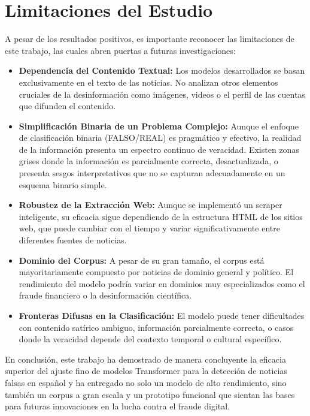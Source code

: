\section{Limitaciones del Estudio}
A pesar de los resultados positivos, es importante reconocer las limitaciones de este trabajo, las cuales abren puertas a futuras investigaciones:
\begin{itemize}
    \item \textbf{Dependencia del Contenido Textual:} Los modelos desarrollados se basan exclusivamente en el texto de las noticias. No analizan otros elementos cruciales de la desinformación como imágenes, videos o el perfil de las cuentas que difunden el contenido.
    
    \item \textbf{Simplificación Binaria de un Problema Complejo:} Aunque el enfoque de clasificación binaria (FALSO/REAL) es pragmático y efectivo, la realidad de la información presenta un espectro continuo de veracidad. Existen zonas grises donde la información es parcialmente correcta, desactualizada, o presenta sesgos interpretativos que no se capturan adecuadamente en un esquema binario simple.
    
    \item \textbf{Robustez de la Extracción Web:} Aunque se implementó un scraper inteligente, su eficacia sigue dependiendo de la estructura HTML de los sitios web, que puede cambiar con el tiempo y variar significativamente entre diferentes fuentes de noticias.
    
    \item \textbf{Dominio del Corpus:} A pesar de su gran tamaño, el corpus está mayoritariamente compuesto por noticias de dominio general y político. El rendimiento del modelo podría variar en dominios muy especializados como el fraude financiero o la desinformación científica.
    
    \item \textbf{Fronteras Difusas en la Clasificación:} El modelo puede tener dificultades con contenido satírico ambiguo, información parcialmente correcta, o casos donde la veracidad depende del contexto temporal o cultural específico.
\end{itemize}

En conclusión, este trabajo ha demostrado de manera concluyente la eficacia superior del ajuste fino de modelos Transformer para la detección de noticias falsas en español y ha entregado no solo un modelo de alto rendimiento, sino también un corpus a gran escala y un prototipo funcional que sientan las bases para futuras innovaciones en la lucha contra el fraude digital.